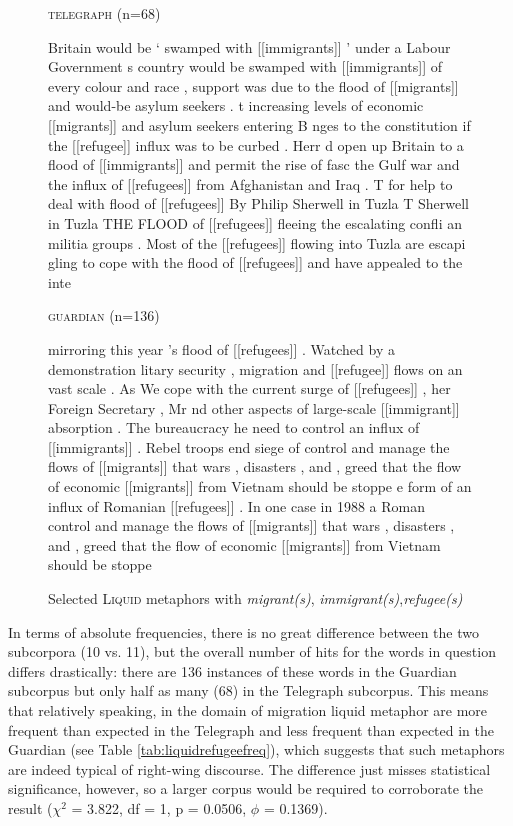 \begin{figure}[!htbp]
\caption{Selected \textsc{Liquid} metaphors with \textit{migrant(s)}, \textit{immigrant(s)},\textit{refugee(s)}}
\label{fig:liquidrefugee}
\textsc{telegraph} (n=68)
\begin{fitverb}
Britain would be ` swamped with [[immigrants]] ' under a Labour Government
s country would be swamped with [[immigrants]] of every colour and race , 
support was due to the flood of [[migrants]] and would-be asylum seekers .
t increasing levels of economic [[migrants]] and asylum seekers entering B
nges to the constitution if the [[refugee]] influx was to be curbed . Herr
d open up Britain to a flood of [[immigrants]] and permit the rise of fasc
 the Gulf war and the influx of [[refugees]] from Afghanistan and Iraq . T
 for help to deal with flood of [[refugees]] By Philip Sherwell in Tuzla T
 Sherwell in Tuzla THE FLOOD of [[refugees]] fleeing the escalating confli
an militia groups . Most of the [[refugees]] flowing into Tuzla are escapi
gling to cope with the flood of [[refugees]] and have appealed to the inte
\end{fitverb}
\textsc{guardian} (n=136)
\begin{fitverb}
mirroring this year 's flood of [[refugees]] . Watched by a demonstration 
litary security , migration and [[refugee]] flows on an vast scale . As We
 cope with the current surge of [[refugees]] , her Foreign Secretary , Mr 
nd other aspects of large-scale [[immigrant]] absorption . The bureaucracy
he need to control an influx of [[immigrants]] . Rebel troops end siege of
control and manage the flows of [[migrants]] that wars , disasters , and ,
greed that the flow of economic [[migrants]] from Vietnam should be stoppe
e form of an influx of Romanian [[refugees]] . In one case in 1988 a Roman
control and manage the flows of [[migrants]] that wars , disasters , and ,
greed that the flow of economic [[migrants]] from Vietnam should be stoppe
\end{fitverb}
\end{figure}

In terms of absolute frequencies, there is no great difference between the two subcorpora (10 vs. 11), but the overall number of hits for the words in question differs drastically: there are 136 instances of these words in the Guardian subcorpus but only half as many (68) in the Telegraph subcorpus. This means that relatively speaking, in the domain of migration liquid metaphor are more frequent than expected in the Telegraph and less frequent than expected in the Guardian (see Table \ref{tab:liquidrefugeefreq}), which suggests that such metaphors are indeed typical of right-wing discourse. The difference just misses statistical significance, however, so a larger corpus would be required to corroborate the result ($\chi^2$ = 3.822, df = 1, p = 0.0506, $\phi$ = 0.1369).


